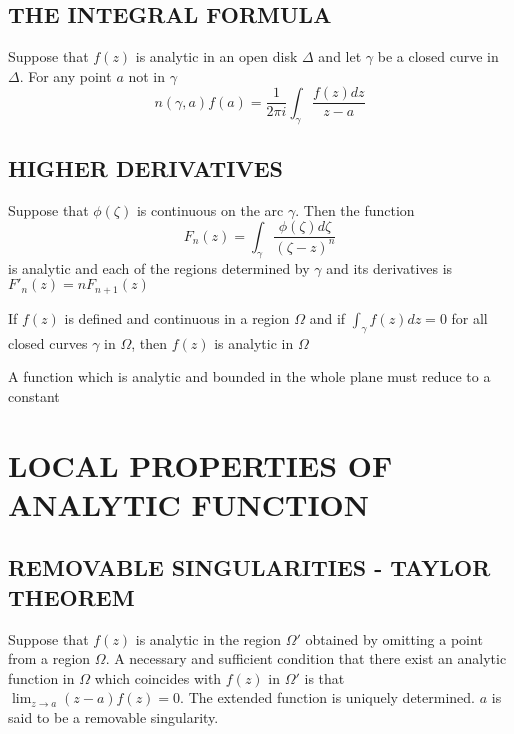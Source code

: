 \documentclass{report}
\begin{document}
\subsection{THE INTEGRAL FORMULA}

\begin{theorem}
    Suppose that $f(z)$ is analytic in an open disk $\Delta$ and let $\gamma$ be a closed curve in $\Delta$. For any point $a$ not in $\gamma$
    \[
        n(\gamma, a) f(a) = \frac{1}{2\pi i} \int_\gamma \frac{f(z)dz}{z-a}
    \]
\end{theorem}

\subsection{HIGHER DERIVATIVES}

\begin{lemma}
    Suppose that $\phi(\zeta)$ is continuous on the arc $\gamma$. Then the function
    \[
        F_n(z) = \int_\gamma \frac{\phi(\zeta) d\zeta}{(\zeta - z)^n}
    \]
    is analytic and each of the regions determined by $\gamma$ and its derivatives is $F'_n(z) = nF_{n+1}(z)$
\end{lemma}

\begin{theorem}
    If $f(z)$ is defined and continuous in a region $\Omega$ and if $\int_\gamma f(z)dz = 0$ for all closed curves $\gamma$ in $\Omega$, then $f(z)$ is analytic in $\Omega$
\end{theorem}

\begin{theorem}
    A function which is analytic and bounded in the whole plane must reduce to a constant
\end{theorem}

\section{LOCAL PROPERTIES OF ANALYTIC FUNCTION}

\subsection{REMOVABLE SINGULARITIES - TAYLOR THEOREM}

\begin{theorem}
    Suppose that $f(z)$ is analytic in the region $\Omega'$ obtained by omitting a point from a region $\Omega$. A necessary and sufficient condition that there exist an analytic function in $\Omega$ which coincides with $f(z)$ in $\Omega'$ is that $\lim_{z \to a} (z-a)f(z) = 0$. The extended function is uniquely determined. $a$ is said to be a removable singularity.
\end{theorem}
\end{document}
